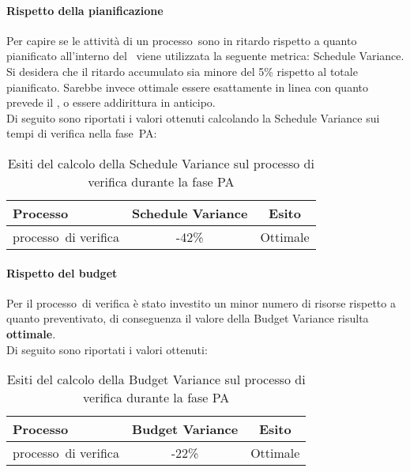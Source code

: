 \documentclass[../PianoDiQualifica.tex]{subfiles}
\begin{document}
\begin{appendices}
			\paragraph{Rispetto della pianificazione}
			Per capire se le attività di un processo\g\ sono in ritardo rispetto a quanto pianificato all'interno del \pianodiprogetto\ viene utilizzata la seguente metrica: Schedule Variance.\\
			Si desidera che il ritardo accumulato sia minore del 5\% rispetto al totale pianificato. Sarebbe invece ottimale essere esattamente in linea con quanto prevede il \pianodiprogetto, o essere addirittura in anticipo.\\
			Di seguito sono riportati i valori ottenuti calcolando la Schedule Variance sui tempi di verifica nella fase\g\ PA:
			\begin{table}[H]
				\centering
				\begin{tabular}{l * {2}{c}}
					\toprule
					\textbf{Processo} & \textbf{Schedule Variance} & \textbf{Esito} \\
					\midrule
					processo\g\ di verifica & -42\% &  Ottimale \\
					\bottomrule
				\end{tabular}
				\caption{Esiti del calcolo della Schedule Variance sul processo di verifica durante la fase PA}
				\label{tab:esiti_schedule_variance}
			\end{table}
			
			\paragraph{Rispetto del budget}
			Per il processo\g\ di verifica è stato investito un minor numero di risorse rispetto a quanto preventivato, di conseguenza il valore della Budget Variance risulta \textbf{ottimale}.\\
			Di seguito sono riportati i valori ottenuti:
			\begin{table}[H]
				\centering
				\begin{tabular}{l * {2}{c}}
					\toprule
					\textbf{Processo} & \textbf{Budget Variance} & \textbf{Esito} \\
					\midrule
					processo\g\ di verifica & -22\% &  Ottimale \\
					\bottomrule
				\end{tabular}
				\caption{Esiti del calcolo della Budget Variance sul processo di verifica durante la fase PA}
				\label{tab:esiti_budget_variance}
			\end{table}
			

\end{appendices}
\end{document}
